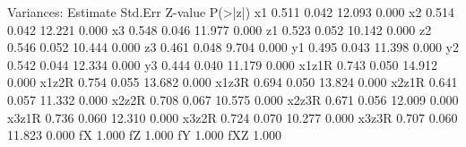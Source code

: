 \begin{Schunk}
\begin{Soutput}
Variances:
                   Estimate  Std.Err  Z-value  P(>|z|)
    x1                0.511    0.042   12.093    0.000
    x2                0.514    0.042   12.221    0.000
    x3                0.548    0.046   11.977    0.000
    z1                0.523    0.052   10.142    0.000
    z2                0.546    0.052   10.444    0.000
    z3                0.461    0.048    9.704    0.000
    y1                0.495    0.043   11.398    0.000
    y2                0.542    0.044   12.334    0.000
    y3                0.444    0.040   11.179    0.000
    x1z1R             0.743    0.050   14.912    0.000
    x1z2R             0.754    0.055   13.682    0.000
    x1z3R             0.694    0.050   13.824    0.000
    x2z1R             0.641    0.057   11.332    0.000
    x2z2R             0.708    0.067   10.575    0.000
    x2z3R             0.671    0.056   12.009    0.000
    x3z1R             0.736    0.060   12.310    0.000
    x3z2R             0.724    0.070   10.277    0.000
    x3z3R             0.707    0.060   11.823    0.000
    fX                1.000                           
    fZ                1.000                           
    fY                1.000                           
    fXZ               1.000                           
\end{Soutput}
\end{Schunk}
